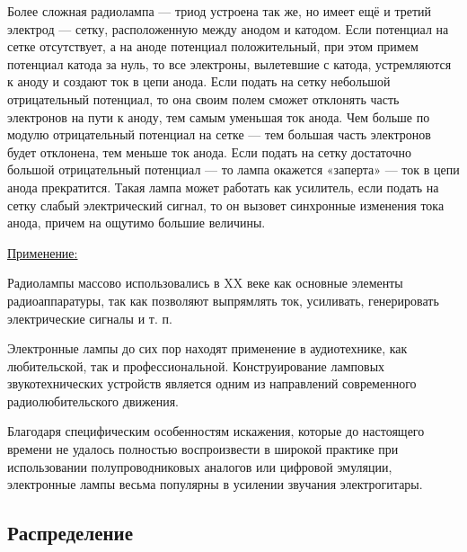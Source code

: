 \par
Более сложная радиолампа — триод устроена так же, но имеет ещё и третий электрод — сетку, расположенную между анодом и катодом. Если потенциал на сетке отсутствует, а на аноде потенциал положительный, при этом примем потенциал катода за нуль, то все электроны, вылетевшие с катода, устремляются к аноду и создают ток в цепи анода. Если подать на сетку небольшой отрицательный потенциал, то она своим полем сможет отклонять часть электронов на пути к аноду, тем самым уменьшая ток анода. Чем больше по модулю отрицательный потенциал на сетке — тем большая часть электронов будет отклонена, тем меньше ток анода. Если подать на сетку достаточно большой отрицательный потенциал — то лампа окажется «заперта» — ток в цепи анода прекратится. Такая лампа может работать как усилитель, если подать на сетку слабый электрический сигнал, то он вызовет синхронные изменения тока анода, причем на ощутимо большие величины.


\underline{Применение:}
\par
Радиолампы массово использовались в XX веке как основные элементы радиоаппаратуры, так как позволяют выпрямлять ток, усиливать, генерировать электрические сигналы и т. п.

Электронные лампы до сих пор находят применение в аудиотехнике, как любительской, так и профессиональной. Конструирование ламповых звукотехнических устройств является одним из направлений современного радиолюбительского движения.

Благодаря специфическим особенностям искажения, которые до настоящего времени не удалось полностью воспроизвести в широкой практике при использовании полупроводниковых аналогов или цифровой эмуляции, электронные лампы весьма популярны в усилении звучания электрогитары.

\subsection{Распределение}

